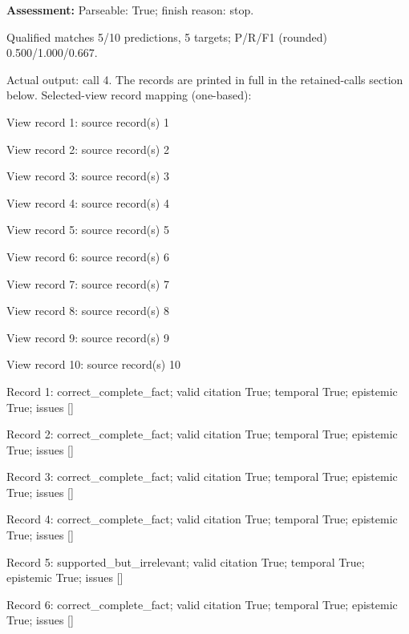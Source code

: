 \noindent\textbf{Assessment:} Parseable: True; finish reason: stop.

Qualified matches 5/10 predictions, 5 targets; P/R/F1 (rounded) 0.500/1.000/0.667.\par

Actual output: call 4. The records are printed in full in the retained-calls section below. Selected-view record mapping (one-based):

View record 1: source record(s) 1\par

View record 2: source record(s) 2\par

View record 3: source record(s) 3\par

View record 4: source record(s) 4\par

View record 5: source record(s) 5\par

View record 6: source record(s) 6\par

View record 7: source record(s) 7\par

View record 8: source record(s) 8\par

View record 9: source record(s) 9\par

View record 10: source record(s) 10\par

Record 1: correct\_complete\_fact; valid citation True; temporal True; epistemic True; issues []\par

Record 2: correct\_complete\_fact; valid citation True; temporal True; epistemic True; issues []\par

Record 3: correct\_complete\_fact; valid citation True; temporal True; epistemic True; issues []\par

Record 4: correct\_complete\_fact; valid citation True; temporal True; epistemic True; issues []\par

Record 5: supported\_but\_irrelevant; valid citation True; temporal True; epistemic True; issues []\par

Record 6: correct\_complete\_fact; valid citation True; temporal True; epistemic True; issues []\par

